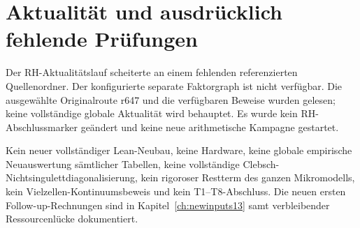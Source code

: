 \section{Aktualität und ausdrücklich fehlende Prüfungen}
Der RH-Aktualitätslauf scheiterte an einem fehlenden referenzierten Quellenordner. Der konfigurierte separate Faktorgraph ist nicht verfügbar. Die ausgewählte Originalroute r647 und die verfügbaren Beweise wurden gelesen; keine vollständige globale Aktualität wird behauptet. Es wurde kein RH-Abschlussmarker geändert und keine neue arithmetische Kampagne gestartet.

Kein neuer vollständiger Lean-Neubau, keine Hardware, keine globale empirische Neuauswertung sämtlicher Tabellen, keine vollständige Clebsch-Nichtsingulettdiagonalisierung, kein rigoroser Restterm des ganzen Mikromodells, kein Vielzellen-Kontinuumsbeweis und kein T1--T8-Abschluss. Die neuen ersten Follow-up-Rechnungen sind in Kapitel~\ref{ch:newinputs13} samt verbleibender Ressourcenlücke dokumentiert.
